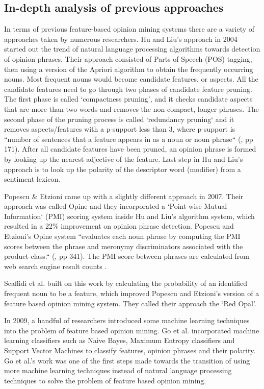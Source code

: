 \documentclass{sig-alternate}
\begin{document}
\subsection{In-depth analysis of previous approaches}
In terms of previous feature-based opinion mining systems there are a variety of approaches taken by numerous researchers. Hu and Liu's approach in 2004 started out the trend of natural language processing algorithms towards detection of opinion phrases. Their approach consisted of Parts of Speech (POS) tagging, then using a version of the Apriori algorithm \cite{AgrawalSrikant} to obtain the frequently occurring nouns. Most frequent nouns would become candidate features, or aspects. All the candidate features need to go through two phases of candidate feature pruning. The first phase is called `compactness pruning', and it checks candidate aspects that are more than two words and removes the non-compact, longer phrases. The second phase of the pruning process is called `redundancy pruning` and it removes aspects/features with a p-support less than 3, where p-support is ``number of sentences that a feature appears in as a noun or noun phrase``  (\cite{HuLiu2004}, pp 171). After all candidate features have been pruned, an opinion phrase is formed by looking up the nearest adjective of the feature. Last step in Hu and Liu's approach is to look up the polarity of the descriptor word (modifier) from a sentiment lexicon. 

Popescu \& Etzioni \cite{PopescuEtzioni2007} came up with a slightly different approach in 2007. Their approach was called Opine and they incorporated a `Point-wise Mutual Information` (PMI) scoring system inside Hu and Liu's algorithm system, which resulted in a 22\% improvement on opinion phrase detection. Popescu and Etzioni's Opine system ``evaluates each noun phrase by computing the PMI scores between the phrase and meronymy discriminators associated with the product class.``  (\cite{PopescuEtzioni2007}, pp 341). The PMI score between phrases are calculated from web search engine result counts \cite{Turney2001}. 

Scaffidi et al. \cite{ScaffidiBierhoffChangFelkerNgJin2007} built on this work by calculating the probability of an identified frequent noun to be a feature, which improved Popescu and Etzioni's version of a feature based opinion mining system. They called their approach the `Red Opal'. 

In 2009, a handful of researchers introduced some machine learning techniques into the problem of feature based opinion mining. Go et al. \cite{GoBhayaniHuang2009} incorporated machine learning classifiers such as Naive Bayes, Maximum Entropy classifiers and Support Vector Machines to classify features, opinion phrases and their polarity. Go et al.'s work was one of the first steps made towards the transition of using more machine learning techniques instead of natural language processing techniques to solve the problem of feature based opinion mining.
\end{document}
